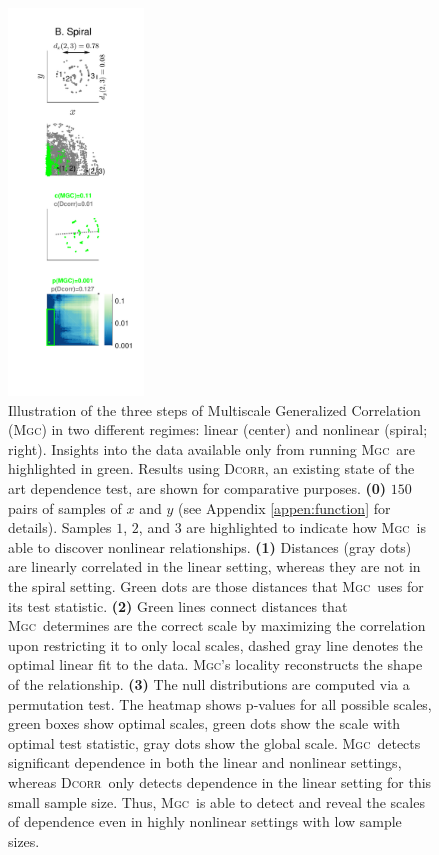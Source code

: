 \documentclass[11pt]{article}
\providecommand{\sct}[1]{{\normalfont\textsc{#1}}}
\newcommand{\Mgc}{\sct{Mgc}}
\newcommand{\Dcorr}{\sct{Dcorr}}
\begin{document}
\begin{figure}
\includegraphics[width=0.32\textwidth,height=0.75\textheight,trim={2.0cm 2.15cm 0.73cm 1.28cm},clip]{Figures/A3_type8_n100_noise3_dim1.pdf}
\caption{Illustration of the three steps of Multiscale Generalized Correlation (\Mgc) in two different regimes: linear (center) and nonlinear (spiral; right). Insights into the data available only from running \Mgc~are highlighted in green.  Results using \Dcorr, an existing state of the art dependence test, are shown for comparative purposes. 
\textbf{(0)}  $150$ pairs of samples of $x$ and $y$ (see Appendix \ref{appen:function} for details). 
Samples $1$, $2$, and $3$ are highlighted to indicate how \Mgc~is able to discover nonlinear relationships. 
% 
\textbf{(1)} Distances (gray dots) are linearly correlated in the linear setting, whereas they are not in the spiral setting.  Green dots are those distances that \Mgc~uses for its test statistic.
% 
\textbf{(2)} Green lines connect distances that \Mgc~determines are the correct scale by maximizing the correlation upon restricting it to only local scales, dashed gray line denotes the optimal linear fit to the data.  \Mgc's locality reconstructs the shape of the relationship. 
% 
\textbf{(3)} The null distributions are computed via a permutation test. The heatmap shows p-values for all possible scales, green boxes show optimal scales, green dots show the scale with optimal test statistic, gray dots show the global scale. \Mgc~detects significant dependence in both the linear and nonlinear settings, whereas \Dcorr~only detects dependence in the linear setting for this small sample size.
% 
Thus, \Mgc~is able to detect and reveal the scales of dependence even in highly nonlinear settings with low sample sizes.}
\label{f:newschem}
\end{figure}
\end{document}
